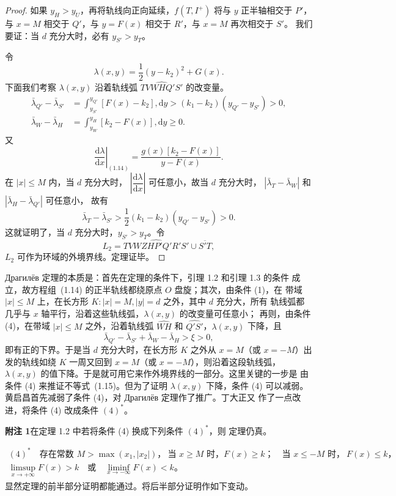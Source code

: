 \begin{proof}
如果 $y_H>y_U$，再将轨线向正向延续，$f(T,I^+)$ 将与 $y$ 正半轴相交于 $P'$，
与 $x=M$ 相交于 $Q'$，与 $y=F(x)$ 相交于 $R'$，与 $x=M$ 再次相交于 $S'$。
我们要证：当 $d$ 充分大时，必有 $y_{S'}>y_T$。

令
\[
  \lambda(x,y)=\dfrac12(y-k_2)^2+G(x).
\]
下面我们考察 $\lambda(x,y)$ 沿着轨线弧 $\widehat{TVWHQ'S'}$ 的改变量。
\[
\begin{aligned}
  \bar\lambda_{Q'}-\bar\lambda_{S'}
  &=\int_{y_{S'}}^{y_{Q'}}[F(x)-k_2],\mathrm{d}y
  >(k_1-k_2)(y_{Q'}-y_{S'})>0,\\
  \bar\lambda_W-\bar\lambda_H
  &=\int_{y_W}^{y_H}[k_2-F(x)],\mathrm{d}y\geq0.
\end{aligned}
\]
又
\[
  \left.\dfrac{\mathrm{d}\lambda}{\mathrm{d}x}\right|_{(1.14)}
  =\dfrac{g(x)[k_2-F(x)]}{y-F(x)}.
\]
在 $|x|\leq M$ 内，当 $d$ 充分大时，
$\left|\dfrac{\mathrm{d}\lambda}{\mathrm{d}x}\right|$ 可任意小，故当 $d$ 充分大时，
$|\bar\lambda_T-\bar\lambda_W|$ 和 $|\bar\lambda_H-\bar\lambda_{Q'}|$ 可任意小，
故有
\[
  \bar\lambda_T-\bar\lambda_{S'}>
  \dfrac12(k_1-k_2)(y_{Q'}-y_{S'})>0.
\]
这就证明了，当 $d$ 充分大时，$y_{S'}>y_T$。令
\[
  L_2=\widehat{TVWZHP'Q'R'S'}\cup\overline{S'T},
\]
$L_2$ 可作为环域的外境界线。定理证毕。
\end{proof}

Драгилёв 定理的本质是：首先在定理的条件下，引理 1.2 和引理 1.3 的条件
成立，故方程组~(1.14) 的正半轨线都绕原点 $O$ 盘旋；其次，由条件 (1)，在
带域 $|x|\leq M$ 上，在长方形 $K:|x|=M,|y|=d$ 之外，其中 $d$ 充分大，所有
轨线弧都几乎与 $x$ 轴平行，沿着这些轨线弧，$\lambda(x,y)$ 的改变量可任意小；
再则，由条件 (4)，在带域 $|x|\leq M$ 之外，沿着轨线弧 $\widehat{WH}$ 和
$\widehat{Q'S'}$，$\lambda(x,y)$ 下降，且
\[
  \bar\lambda_{Q'}-\bar\lambda_{S'}+\bar\lambda_W-\bar\lambda_H>\xi>0,
\]
即有正的下界。于是当 $d$ 充分大时，在长方形 $K$ 之外从 $x=M$（或
$x=-M$）出发的轨线如绕 $K$ 一周又回到 $x=M$（或 $x=-M$），则沿着这段轨线弧，
$\lambda(x,y)$ 的值下降。于是就可用它来作外境界线的一部分。这里关键的一步是
由条件 (4) 来推证不等式~(1.15)。但为了证明 $\lambda(x,y)$ 下降，条件 (4)
可以减弱。黄启昌首先减弱了条件 (4)，对 Драгилёв 定理作了推广\cite{11}。丁大正又
作了一点改进\cite{12}，将条件 (4) 改成条件 $(4)^*$。

\noindent\textbf{附注 1}\quad 在定理 1.2 中若将条件 (4) 换成下列条件 $(4)^*$，则
定理仍真。

\[
\begin{gathered}
  (4)^*\quad\text{存在常数 }M>\max(x_1,|x_2|)，\ \text{当 }x\geq M\text{ 时，}
  F(x)\geq k；\quad\text{当 }x\leq-M\text{ 时，}\ F(x)\leq k，\\
  \limsup_{x\to+\infty}F(x)>k
  \quad\text{或}\quad
  \liminf_{x\to-\infty}F(x)<k。
\end{gathered}
\]
显然定理的前半部分证明都能通过。将后半部分证明作如下变动。

